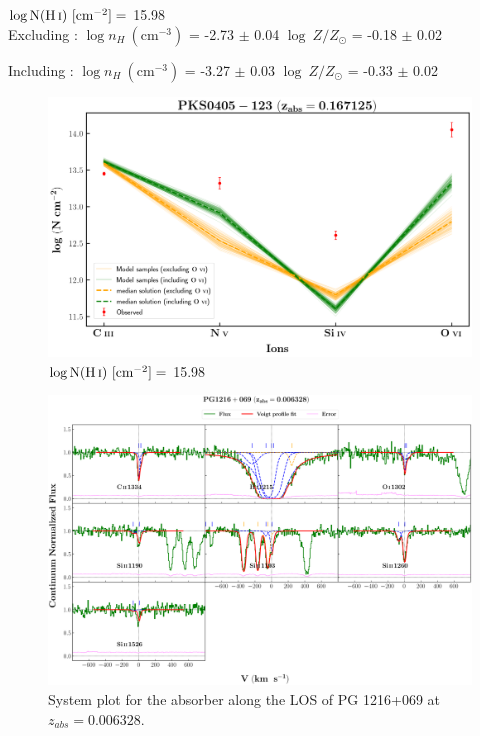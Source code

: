   $\log \text{N}(\ion{H}{i}) \ [\text{cm}^{-2}]=$  15.98  \\ 
  
  Excluding  : $\log n_H \ (\text{cm}^{-3})$ = -2.73 $\pm$ 0.04 \hspace{10mm} $\log \ Z/Z_\odot$ = -0.18 $\pm$ 0.02
  
  Including  : $\log n_H \ (\text{cm}^{-3})$ = -3.27 $\pm$ 0.03 \hspace{10mm} $\log \ Z/Z_\odot$ = -0.33 $\pm$ 0.02
  
  \begin{figure}[!h]
    \centering
    \includegraphics[width=0.85\linewidth]{Ionisation-Modelling-Plots/pks0405-z=0.167125-compII.png}
    \caption{$\log \text{N}(\ion{H}{i}) \ [\text{cm}^{-2}]=$ 15.98}
  \end{figure}
  
  
  \newpage
  
  \begin{landscape}
  
  \begin{figure}
      \centering
      \vspace{-20mm}
      \hspace*{-35mm}
      \includegraphics[width=1.25\linewidth]{System-Plots/PG1216+069_z=0.006328_sys_plot.png}
      \caption{System plot for the absorber along the LOS of PG 1216+069 at $z_{abs} = 0.006328$. }
  \end{figure}
  
  \end{landscape}
  
